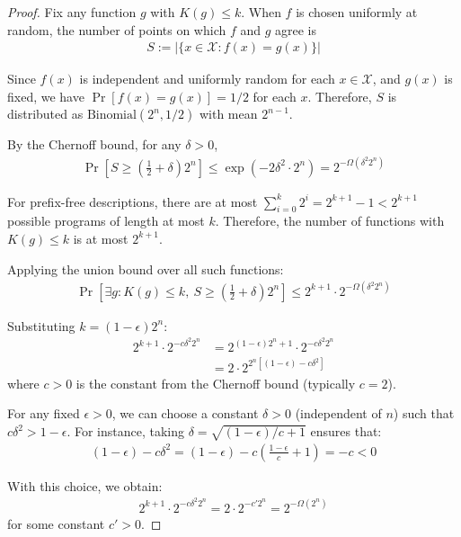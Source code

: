 \documentclass[11pt,letter,leqno]{article}
\begin{document}
\begin{proof}
Fix any function $g$ with $K(g) \leq k$. When $f$ is chosen uniformly at random, the number of points on which $f$ and $g$ agree is
\begin{align}
S := |\{x \in \mathcal{X} : f(x) = g(x)\}|
\end{align}

Since $f(x)$ is independent and uniformly random for each $x \in \mathcal{X}$, and $g(x)$ is fixed, we have $\Pr[f(x) = g(x)] = 1/2$ for each $x$. Therefore, $S$ is distributed as $\text{Binomial}(2^n, 1/2)$ with mean $2^{n-1}$.

By the Chernoff bound, for any $\delta > 0$,
\begin{align}
\Pr\left[S \geq \left(\frac{1}{2} + \delta\right)2^n\right] \leq \exp(-2\delta^2 \cdot 2^n) = 2^{-\Omega(\delta^2 2^n)}
\end{align}

For prefix-free descriptions, there are at most $\sum_{i=0}^{k} 2^i = 2^{k+1} - 1 < 2^{k+1}$ possible programs of length at most $k$. Therefore, the number of functions with $K(g) \leq k$ is at most $2^{k+1}$.

Applying the union bound over all such functions:
\begin{align}
\Pr\left[\exists g : K(g) \leq k,\ S \geq \left(\frac{1}{2} + \delta\right)2^n \right] \leq 2^{k+1} \cdot 2^{-\Omega(\delta^2 2^n)}
\end{align}

Substituting $k = (1-\epsilon)2^n$:
\begin{align}
2^{k+1} \cdot 2^{-c\delta^2 2^n} &= 2^{(1-\epsilon)2^n + 1} \cdot 2^{-c\delta^2 2^n}\\
&= 2 \cdot 2^{2^n[(1-\epsilon) - c\delta^2]}
\end{align}
where $c > 0$ is the constant from the Chernoff bound (typically $c = 2$).

For any fixed $\epsilon > 0$, we can choose a constant $\delta > 0$ (independent of $n$) such that $c\delta^2 > 1 - \epsilon$. For instance, taking $\delta = \sqrt{(1-\epsilon)/c + 1}$ ensures that:
\begin{align}
(1-\epsilon) - c\delta^2 = (1-\epsilon) - c\left(\frac{1-\epsilon}{c} + 1\right) = -c < 0
\end{align}

With this choice, we obtain:
\begin{align}
2^{k+1} \cdot 2^{-c\delta^2 2^n} = 2 \cdot 2^{-c' 2^n} = 2^{-\Omega(2^n)}
\end{align}
for some constant $c' > 0$.


\end{proof}
\end{document}
